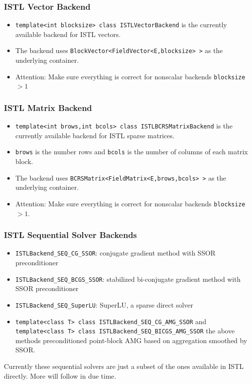 \begin{frame}
  \frametitle{ISTL Vector Backend}
  \begin{itemize}
  \item \lstinline!template<int blocksize> class ISTLVectorBackend!
    is the currently available backend for ISTL vectors.
  \item The backend uses
    \lstinline!BlockVector<FieldVector<E,blocksize> >! as the
    underlying container.
  \item Attention: Make sure everything is correct for nonscalar backends
    \lstinline!blocksize!$>1$
  \end{itemize}
\end{frame}

\begin{frame}
  \frametitle{ISTL Matrix Backend}
  \begin{itemize} 
    \item \lstinline!template<int brows,int bcols> class ISTLBCRSMatrixBackend!
      is the currently available backend for ISTL sparse
      matrices.
    \item \lstinline!brows! is the number rows and \lstinline!bcols!
      is the number of columns of each matrix block.
  \item The backend uses
    \lstinline!BCRSMatrix<FieldMatrix<E,brows,bcols> >! as the
    underlying container.
  \item Attention: Make sure everything is correct for nonscalar backends
    \lstinline!blocksize!$>1$.
  \end{itemize}
\end{frame}
\begin{frame}[fragile]
  \frametitle{ISTL Sequential Solver Backends}
    \begin{itemize}
    \item \lstinline!ISTLBackend_SEQ_CG_SSOR!:  conjugate gradient method with SSOR preconditioner
    \item \lstinline!ISTLBackend_SEQ_BCGS_SSOR!: stabilized bi-conjugate gradient
      method with SSOR preconditioner
    \item \lstinline!ISTLBackend_SEQ_SuperLU!: SuperLU, a sparse
      direct solver
    \item \lstinline!template<class T> class ISTLBackend_SEQ_CG_AMG_SSOR! and
      \lstinline!template<class T> class ISTLBackend_SEQ_BICGS_AMG_SSOR! the
      above methods 
      preconditioned point-block AMG based on aggregation smoothed by SSOR.
    \end{itemize}
    Currently these sequential solvers are just a subset of the ones
  available in ISTL directly. More will follow in due time.
\end{frame}

